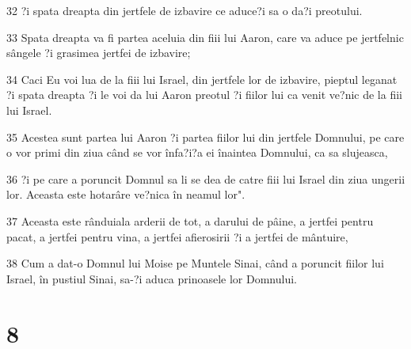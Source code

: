 \par 32 ?i spata dreapta din jertfele de izbavire ce aduce?i sa o da?i preotului.
\par 33 Spata dreapta va fi partea aceluia din fiii lui Aaron, care va aduce pe jertfelnic sângele ?i grasimea jertfei de izbavire;
\par 34 Caci Eu voi lua de la fiii lui Israel, din jertfele lor de izbavire, pieptul leganat ?i spata dreapta ?i le voi da lui Aaron preotul ?i fiilor lui ca venit ve?nic de la fiii lui Israel.
\par 35 Acestea sunt partea lui Aaron ?i partea fiilor lui din jertfele Domnului, pe care o vor primi din ziua când se vor înfa?i?a ei înaintea Domnului, ca sa slujeasca,
\par 36 ?i pe care a poruncit Domnul sa li se dea de catre fiii lui Israel din ziua ungerii lor. Aceasta este hotarâre ve?nica în neamul lor".
\par 37 Aceasta este rânduiala arderii de tot, a darului de pâine, a jertfei pentru pacat, a jertfei pentru vina, a jertfei afierosirii ?i a jertfei de mântuire,
\par 38 Cum a dat-o Domnul lui Moise pe Muntele Sinai, când a poruncit fiilor lui Israel, în pustiul Sinai, sa-?i aduca prinoasele lor Domnului.

\chapter{8}

